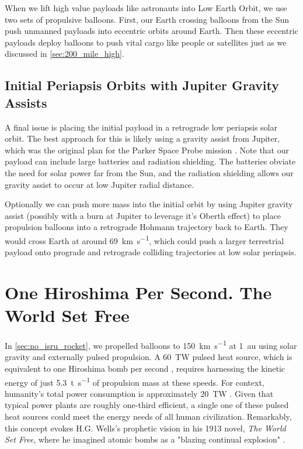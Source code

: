 \documentclass{article}
\begin{document}
{When we lift high value payloads like astronauts into Low Earth Orbit, we use two sets of propulsive balloons. First, our Earth crossing balloons from the Sun push unmanned payloads into eccentric orbits around Earth. Then these eccentric payloads deploy balloons to push vital cargo like people or  satellites just as we discussed in \autoref{sec:200_mile_high}.

\subsection{Initial Periapsis Orbits with Jupiter Gravity Assists} \label{sec:jupiter_gravity_initial}
A final issue is placing the initial payload in a retrograde low periapsis solar orbit.  The best approach for this is likely using a gravity assist from Jupiter, which was the original plan for the Parker Space Probe mission \cite{mccomas2005solar}. Note that our payload can include large batteries and radiation shielding.  The batteries obviate the need for solar power far from the Sun, and the radiation shielding allows our gravity assist to occur at low Jupiter radial distance.   

Optionally we can push more mass into the initial orbit by using Jupiter gravity assist (possibly with a burn at Jupiter to leverage it's Oberth effect) to place propulsion balloons into a retrograde Hohmann trajectory back to Earth.   They would cross Earth at around \SI{69}{\kilo\meter\per\second}, which could push a larger terrestrial payload onto  prograde and retrograde colliding trajectories at low solar periapsis.

\section{One Hiroshima Per Second. The World Set Free}\label{sec:world_set_free}
In \autoref{sec:no_isru_rocket}, we propelled balloons to \SI{150}{\kilo\meter\per\second} at \SI{1}{\astronomicalunit} using solar gravity and externally pulsed propulsion. A \SI{60}{\tera\watt} pulsed heat source, which is equivalent to one Hiroshima bomb per second \cite{hiroshima}, requires harnessing the kinetic energy of just \SI{5.3}{\tonne\per\second} of propulsion mass at these speeds. For context, humanity's total power consumption is approximately \SI{20}{\tera\watt} \cite{owid-energy-production-consumption}. Given that typical power plants are roughly one-third efficient, a single one of these pulsed heat sources could meet the energy needs of all human civilization.  Remarkably, this concept evokes H.G. Wells's prophetic vision in his 1913 novel, \textit{The World Set Free}, where he imagined atomic bombs as a "blazing continual explosion" \cite{wells1914world}.  

}
\end{document}
